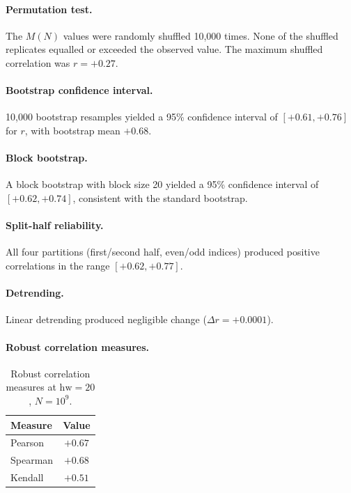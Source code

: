 \documentclass[11pt,a4paper]{article}
\newcommand{\MN}{M(N)}
\begin{document}
\paragraph{Permutation test.} The $\MN$ values were randomly shuffled 10{,}000 times. None of the shuffled replicates equalled or exceeded the observed value. The maximum shuffled correlation was $r = +0.27$.

\paragraph{Bootstrap confidence interval.} 10{,}000 bootstrap resamples yielded a 95\% confidence interval of $[+0.61, +0.76]$ for $r$, with bootstrap mean $+0.68$.

\paragraph{Block bootstrap.} A block bootstrap with block size 20 yielded a 95\% confidence interval of $[+0.62, +0.74]$, consistent with the standard bootstrap.

\paragraph{Split-half reliability.} All four partitions (first/second half, even/odd indices) produced positive correlations in the range $[+0.62, +0.77]$.

\paragraph{Detrending.} Linear detrending produced negligible change ($\Delta r = +0.0001$).

\paragraph{Robust correlation measures.}

\begin{table}[h]
\centering
\begin{tabular}{l c}
\toprule
Measure & Value \\
\midrule
Pearson & $+0.67$ \\
Spearman & $+0.68$ \\
Kendall & $+0.51$ \\
\bottomrule
\end{tabular}
\caption{Robust correlation measures at $\mathrm{hw}=20$, $N=10^9$.}
\label{tab:robust}
\end{table}
\end{document}
